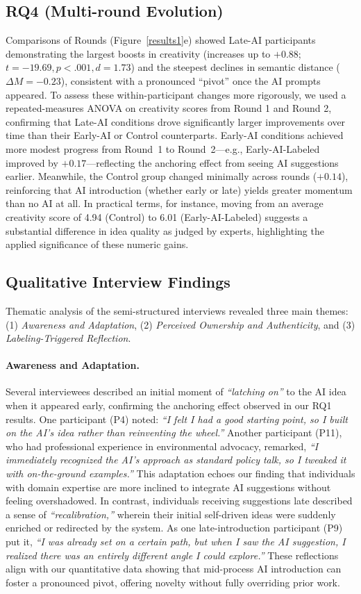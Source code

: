 \documentclass{article}
\begin{document}
\subsection{RQ4 (Multi-round Evolution)} 
Comparisons of Rounds (Figure~\ref{results1}e) showed Late-AI participants demonstrating the largest boosts in creativity (increases up to \(+0.88\); \(t = -19.69, p < .001, d = 1.73\)) and the steepest declines in semantic distance (\(\Delta M = -0.23\)), consistent with a pronounced “pivot” once the AI prompts appeared. To assess these within-participant changes more rigorously, we used a repeated-measures ANOVA on creativity scores from Round 1 and Round 2, confirming that Late-AI conditions drove significantly larger improvements over time than their Early-AI or Control counterparts. Early-AI conditions achieved more modest progress from Round~1 to Round~2—e.g., Early-AI-Labeled improved by \(+0.17\)—reflecting the anchoring effect from seeing AI suggestions earlier. Meanwhile, the Control group changed minimally across rounds (\(+0.14\)), reinforcing that AI introduction (whether early or late) yields greater momentum than no AI at all. In practical terms, for instance, moving from an average creativity score of 4.94 (Control) to 6.01 (Early-AI-Labeled) suggests a substantial difference in idea quality as judged by experts, highlighting the applied significance of these numeric gains.

\subsection{Qualitative Interview Findings}
Thematic analysis of the semi-structured interviews revealed three main themes: (1) \emph{Awareness and Adaptation}, (2) \emph{Perceived Ownership and Authenticity}, and (3) \emph{Labeling-Triggered Reflection}. 

\paragraph{Awareness and Adaptation.} Several interviewees described an initial moment of \emph{“latching on”} to the AI idea when it appeared early, confirming the anchoring effect observed in our RQ1 results. One participant (P4) noted: \emph{“I felt I had a good starting point, so I built on the AI’s idea rather than reinventing the wheel.”}  Another participant (P11), who had professional experience in environmental advocacy, remarked, \emph{“I immediately recognized the AI’s approach as standard policy talk, so I tweaked it with on-the-ground examples.”} This adaptation echoes our finding that individuals with domain expertise are more inclined to integrate AI suggestions without feeling overshadowed. In contrast, individuals receiving suggestions late described a sense of \emph{“recalibration,”} wherein their initial self-driven ideas were suddenly enriched or redirected by the system. As one late-introduction participant (P9) put it, \emph{“I was already set on a certain path, but when I saw the AI suggestion, I realized there was an entirely different angle I could explore.” }These reflections align with our quantitative data showing that mid-process AI introduction can foster a pronounced pivot, offering novelty without fully overriding prior work.
\end{document}
